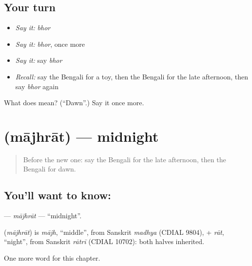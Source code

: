 \subsection*{Your turn}
\begin{itemize}
\raggedright
  \item \emph{Say it:} \emph{bhor}
  \item \emph{Say it:} \emph{bhor}, once more
  \item \emph{Say it:} say \emph{bhor}
  \item \emph{Recall:} say the Bengali for a toy, then the Bengali for the late afternoon, then say \emph{bhor} again
\end{itemize}

\begin{tcolorbox}[breakable,colback=teal!4,colframe=teal!35!black,title={Before you move on}]
What does  mean? (\textquotedblleft{}Dawn\textquotedblright{}.) Say it once more.
\end{tcolorbox}
\section[\texorpdfstring{\bn{মাঝরাত} (mājhrāt)}{মাঝরাত (mājhrāt)}]{ (mājhrāt) — midnight}

\label{lesson:BN-C90-majhrat}



\begin{quote}
Before the new one: say the Bengali for the late afternoon, then the Bengali for dawn.
\end{quote}

\subsection*{You'll want to know: }
\textbf{} — \emph{mājhrāt} — \textquotedblleft{}midnight\textquotedblright{}.

\begin{cousinweb}
\textbf{} (\emph{mājhrāt}) is \emph{mājh}, \textquotedblleft{}middle\textquotedblright{}, from Sanskrit \emph{madhya} (CDIAL 9804), + \emph{rāt}, \textquotedblleft{}night\textquotedblright{}, from Sanskrit \emph{rātrī} (CDIAL 10702): both halves inherited.
\end{cousinweb}

\begin{grammarlens}[title={What you've built}]
One more word for this chapter.
\end{grammarlens}

